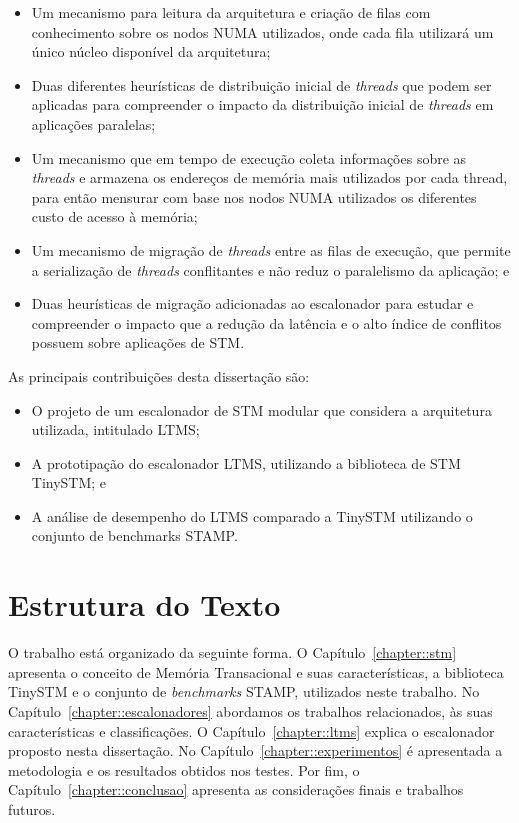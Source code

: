 \documentclass[diss,capa]{texufpel}
\begin{document}
\begin{itemize}
\item Um mecanismo para leitura da arquitetura e criação de filas com conhecimento sobre os nodos NUMA utilizados, onde cada fila utilizará um único núcleo disponível da arquitetura;
\item Duas diferentes heurísticas de distribuição inicial de \emph{threads} que podem ser aplicadas para compreender o impacto da distribuição inicial de \emph{threads} em aplicações paralelas;
\item Um mecanismo que em tempo de execução coleta informações sobre as \emph{threads} e armazena os endereços de memória mais utilizados por cada thread, para então mensurar com base nos nodos NUMA utilizados os diferentes custo de acesso à memória;
\item Um mecanismo de migração de \emph{threads} entre as filas de execução, que permite a serialização de \emph{threads} conflitantes e não reduz o paralelismo da aplicação; e
\item Duas heurísticas de migração adicionadas ao escalonador para estudar e compreender o impacto que a redução da latência e o alto índice de conflitos possuem sobre aplicações de STM.
\end{itemize}

As principais contribuições desta dissertação são:

\begin{itemize}
 \item O projeto de um escalonador de STM modular que considera a arquitetura utilizada, intitulado LTMS;
 \item A prototipação do escalonador LTMS, utilizando a biblioteca de STM TinySTM; e
 \item A análise de desempenho do LTMS comparado a TinySTM utilizando o conjunto de benchmarks STAMP.
\end{itemize}

\section{Estrutura do Texto}

O trabalho está organizado da seguinte forma. O Capítulo~\ref{chapter::stm} apresenta o conceito de Memória Transacional e suas características, a biblioteca TinySTM e o conjunto de \emph{benchmarks} STAMP, utilizados neste trabalho. No Capítulo~\ref{chapter::escalonadores} abordamos os trabalhos relacionados, às suas características e classificações. O Capítulo~\ref{chapter::ltms} explica o escalonador proposto nesta dissertação. No Capítulo~\ref{chapter::experimentos} é apresentada a metodologia e os resultados obtidos nos testes. Por fim, o Capítulo~\ref{chapter::conclusao} apresenta as considerações finais e trabalhos futuros.
\end{document}
